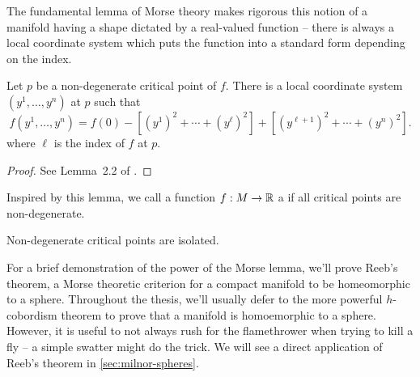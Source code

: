The fundamental lemma of Morse theory makes rigorous this notion of a manifold having a shape dictated by a real-valued function -- there is always a local coordinate system which puts the function into a standard form depending on the index.

\begin{lemma}\label{lemma:morse}
	Let $p$ be a non-degenerate critical point of $f$. There is a local coordinate system $(y^1,\ldots, y^n)$ at $p$ such that
	\begin{equation}
		f(y^1,\ldots, y^n)=f(0)-\left[(y^1)^2 + \cdots + (y^{\ell})^2\right] + \left[(y^{\ell + 1})^2 + \cdots + (y^n)^2\right].
	\end{equation}
	where $\ell$ is the index of $f$ at $p$.
\end{lemma}
\begin{proof}
	See Lemma~2.2 of \cite{milnor1963morse}.
\end{proof}

Inspired by this lemma, we call a function $f : M \to \mathbb{R}$ a  if all critical points are non-degenerate.

\begin{corollary}
	Non-degenerate critical points are isolated.
\end{corollary}

For a brief demonstration of the power of the Morse lemma, we'll prove Reeb's theorem, a Morse theoretic criterion for a compact manifold to be homeomorphic to a sphere. Throughout the thesis, we'll usually defer to the more powerful $h$-cobordism theorem to prove that a manifold is homoemorphic to a sphere.
However, it is useful to not always rush for the flamethrower when trying to kill a fly -- a simple swatter might do the trick. We will see a direct application of Reeb's theorem in \cref{sec:milnor-spheres}.

